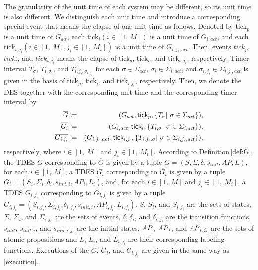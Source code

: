 \documentclass[journal,twoside,web]{IEEEtran}
\newcommand{\rdef}[1]{Definition\,\ref{#1}}
\newcommand{\req}[1]{\eqref{#1}}
\newcommand{\tick}{{\sf tick}}
\newcommand{\AP}{{\textit AP}}
\begin{document}
The granularity of the unit time of each system may be different, so its unit time is also different. 
We distinguish each unit time and introduce a corresponding special event that means the elapse of one unit time as follows.
%
Denoted by \tick$_p$ is a unit time of $G_{act}$, each \tick$_i (i\in[1,\ M])$ is a unit time of $G_{i,act}$, and each \tick$_{i,{j_i}} (i\in[1,\ M], j_i\in[1,\ M_i])$ is a unit time of $G_{i,{j_i},act}$. Then,  events $\textit{tick}_p$, $\textit{tick}_i$, and $\textit{tick}_{i,{j_i}}$ means the elapse of \tick$_p$, \tick$_{i}$, and \tick$_{i,{j_i}}$, respectively.
%
%
%
%
Timer interval $T_\sigma$, $T_{i,\sigma_i}$, and $T_{i,{j_i},\sigma_{i,{j_i}}}$ for each $\sigma\in\Sigma_{act}$, $\sigma_i\in\Sigma_{i,act}$, and $\sigma_{i,{j_i}}\in\Sigma_{i,{j_i},act}$ is given in the basis of \tick$_p$, \tick$_i$, and \tick$_{i,{j_i}}$, respectively.
%
%
Then, we denote the DES together with the corresponding unit time and the corresponding timer interval by
\begin{eqnarray}
\overline{G}&\coloneqq&(G_{act},\mbox{\tick}_p,\{T_{\sigma} |~\sigma\in \Sigma_{act} \}),\notag\\
 \overline{G_i}&\coloneqq&(G_{i,act},\mbox{\tick}_i,\{T_{i,\sigma} |~\sigma\in \Sigma_{i,act} \}),\notag\\
\overline{G_{i,{j_i}}}&\coloneqq&(G_{i,{j_i},act},\mbox{\tick}_{i,{j_i}},\{T_{i,{j_i},\sigma} |~\sigma\in \Sigma_{i,j_i,act} \}),\notag
\end{eqnarray}
respectively, where $i\in [1,\ M]$ and $j_i\in [1,\ M_i]$.
According to \rdef{def:G}, the TDES $G$ corresponding to $\overline{G}$ is given by a tuple $G=(S,\Sigma,\delta,s_{init},AP,L)$, for each $i\in[1,\ M]$, a TDES $G_i$ corresponding to $\overline{G_i}$ is given by a tuple $G_i=(S_{i},\Sigma_{i},\delta_{i},s_{init,i},AP_{i},L_{i})$, and, for each $i\in[1,\ M]$ and $j_i\in[1,\ M_i]$, a TDES $G_{i,{j_i}}$ corresponding to $\overline{G_{i,{j_i}}}$ is given by a tuple $G_{i,j_i}=(S_{i,{j_i}},\Sigma_{i,{j_i}},\delta_{i,{j_i}},s_{init,i},AP_{i,{j_i}},L_{i,{j_i}})$.
%
$S$, $S_i$, and $S_{i,{j_i}}$ are the sets of states, $\Sigma$, $\Sigma_i$, and $\Sigma_{i,{j_i}}$ are the sets of events, $\delta$, $\delta_i$, and $\delta_{i,{j_i}}$ are the transition functions, $s_{init}$, $s_{init,i}$, and $s_{init,i,{j_i}}$ are the initial states, $\AP$, $\AP_i$, and $\AP_{i,{j_i}}$ are the sets of atomic propositions and $L$, $L_i$, and $L_{i,{j_i}}$ are their corresponding labeling functions.
%
Executions of the $G$, $G_{i}$, and $G_{i,{j_i}}$ are given in the same way as \req{execution}. 
\end{document}
